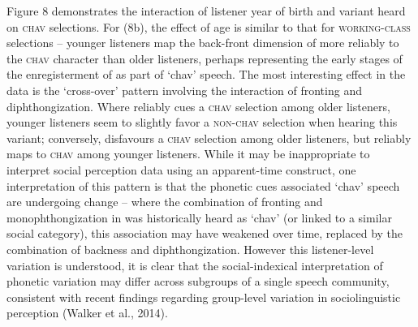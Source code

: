 \documentclass[PWPL]{article}
\begin{document}
Figure 8 demonstrates the interaction of listener year of birth and variant heard on \textsc{chav} selections. For  (8b), the effect of age is similar to that for \textsc{working-class} selections -- younger listeners map the back-front dimension of  more reliably to the \textsc{chav} character than older listeners, perhaps representing the early stages of the enregisterment of  as part of `chav' speech. The most interesting effect in the  data is the `cross-over' pattern involving the interaction of fronting and diphthongization. Where \textipa{[8:]} reliably cues a \textsc{chav} selection among older listeners, younger listeners seem to slightly favor a \textsc{non-chav} selection when hearing this variant; conversely, \textipa{[oU]} disfavours a \textsc{chav} selection among older listeners, but reliably maps to \textsc{chav} among younger listeners. While it may be inappropriate to interpret social perception data using an apparent-time construct, one interpretation of this pattern is that the phonetic cues associated `chav' speech are undergoing change -- where the combination of fronting and monophthongization in  was historically heard as `chav' (or linked to a similar social category), this association may have weakened over time, replaced by the combination of backness and diphthongization. However this listener-level variation is understood, it is clear that the social-indexical interpretation of phonetic variation may differ across subgroups of a single speech community, consistent with recent findings regarding group-level variation in sociolinguistic perception (Walker et al., 2014).
\end{document}
